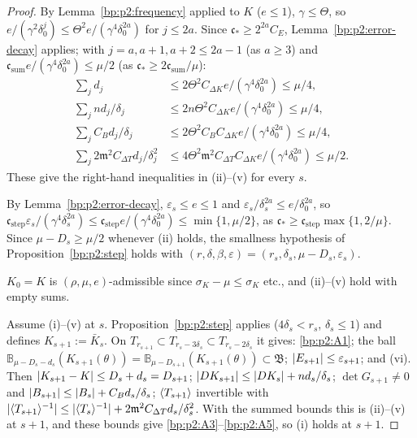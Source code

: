 \begin{proof}
\label{step:p2:it-sums}
By Lemma~\ref{bp:p2:frequency} applied to $K$ ($e\le1$), $\gamma\le\Theta$, so $e/(\gamma^2\delta_0^j)\le
\Theta^2e/(\gamma^4\delta_0^{2a})$ for $j\le2a$. Since $\mathfrak c_*\ge2^{2a}C_E$,
Lemma~\ref{bp:p2:error-decay} applies; with $j=a,a+1,a+2\le2a-1$ (as $a\ge3$) and
$\mathfrak c_{\mathrm{sum}}e/(\gamma^4\delta_0^{2a})\le\mu/2$ (as $\mathfrak c_*\ge2\mathfrak
c_{\mathrm{sum}}/\mu$):
\begin{align*}
\textstyle\sum_jd_j&\le2\Theta^2C_{\Delta K}e/(\gamma^4\delta_0^{2a})\le\mu/4,\\
\textstyle\sum_jnd_j/\delta_j&\le2n\Theta^2C_{\Delta K}e/(\gamma^4\delta_0^{2a})\le\mu/4,\\
\textstyle\sum_jC_Bd_j/\delta_j&\le2\Theta^2C_BC_{\Delta K}e/(\gamma^4\delta_0^{2a})\le\mu/4,\\
\textstyle\sum_j2\mathfrak m^2C_{\Delta T}d_j/\delta_j^2&\le4\Theta^2\mathfrak m^2C_{\Delta T}C_{\Delta K}
e/(\gamma^4\delta_0^{2a})\le\mu/2.
\end{align*}
These give the right-hand inequalities in (ii)--(v) for every $s$.

\label{step:p2:it-stepsmall}
By Lemma~\ref{bp:p2:error-decay}, $\varepsilon_s\le e\le1$ and $\varepsilon_s/\delta_s^{2a}\le e/
\delta_0^{2a}$, so $\mathfrak c_{\mathrm{step}}\varepsilon_s/(\gamma^4\delta_s^{2a})\le\mathfrak
c_{\mathrm{step}}e/(\gamma^4\delta_0^{2a})\le\min\{1,\mu/2\}$, as $\mathfrak c_*\ge\mathfrak
c_{\mathrm{step}}\max\{1,2/\mu\}$. Since $\mu-D_s\ge\mu/2$ whenever (ii) holds, the smallness hypothesis of
Proposition~\ref{bp:p2:step} holds with $(r,\delta,\beta,\varepsilon)=(r_s,\delta_s,\mu-D_s,
\varepsilon_s)$.

\label{step:p2:it-base}
$K_0=K$ is $(\rho,\mu,e)$-admissible since $\sigma_K-\mu\le\sigma_K$ etc., and (ii)--(v) hold with empty
sums.

\label{step:p2:it-step}
Assume (i)--(v) at $s$. Proposition~\ref{bp:p2:step} applies ($4\delta_s<r_s$, $\delta_s\le1$) and
defines $K_{s+1}:=\bar K_s$. On $T_{r_{s+1}}\subset T_{r_s-3\delta_s}\subset T_{r_s-2\delta_s}$ it gives:
\ref{bp:p2:A1}; the ball $\mathbb B_{\mu-D_s-d_s}(K_{s+1}(\theta))=\mathbb B_{\mu-D_{s+1}}(K_{s+1}
(\theta))\subset\mathfrak B$; $\lvert E_{s+1}\rvert\le\varepsilon_{s+1}$; and (vi). Then
$\lvert K_{s+1}-K\rvert\le D_s+d_s=D_{s+1}$; $\lvert DK_{s+1}\rvert\le\lvert DK_s\rvert+nd_s/\delta_s$; $\det G_{s+1}\ne0$
and $\lvert B_{s+1}\rvert\le\lvert B_s\rvert+C_Bd_s/\delta_s$; $\langle T_{s+1}\rangle$ invertible with $\lvert \langle T_{s+1}\rangle^{-1}\rvert
\le\lvert \langle T_s\rangle^{-1}\rvert+2\mathfrak m^2C_{\Delta T}d_s/\delta_s^2$. With the summed bounds this is
(ii)--(v) at $s+1$, and these bounds give \ref{bp:p2:A3}--\ref{bp:p2:A5}, so (i) holds at $s+1$.
\end{proof}

